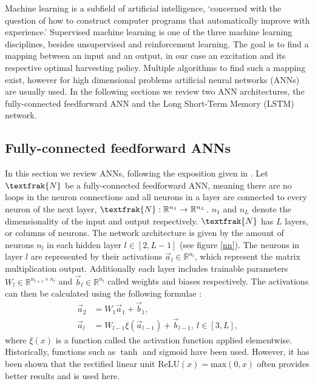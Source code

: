 Machine learning is a subfield of artificial intelligence, `concerned with the question of how to construct computer programs that automatically improve with experience.' \cite{Mitchell97}
Supervised machine learning is one of the three machine learning disciplines, besides unsupervised and reinforcement learning.
The goal is to find a mapping between an input and an output, in our case an excitation and its respective optimal harvesting policy.
Multiple algorithms to find such a mapping exist, however for high dimensional problems artificial neural networks (ANNs) are usually used.
In the following sections we review two ANN architectures, the fully-connected feedforward ANN and the Long Short-Term Memory (LSTM) network.

\subsection{Fully-connected feedforward ANNs}
In this section we review ANNs, following the exposition given in \cite{lu2020dying}.
Let $\textfrak{N}$ be a fully-connected feedforward ANN, meaning there are no loops in the neuron connections and all neurons in a layer are connected to every neuron of the next layer, $\textfrak{N}: \mathbb{R}^{n_1} \to \mathbb{R}^{n_L}$. $n_1$ and $n_L$ denote the dimensionality of the input and output respectively. 
$\textfrak{N}$ has $L$ layers, or columns of neurons.
The network architecture is given by the amount of neurons $n_l$ in each hidden layer $l \in [2, L - 1]$ (see figure \ref{nn}).
The neurons in layer $l$ are represented by their activations $\vec{a}_l \in \mathbb{R}^{n_l}$, which represent the matrix multiplication output. Additionally each layer includes trainable parameters $W_l \in \mathbb{R}^{n_{l+1} \times n_{l}}$ and $\vec{b}_l \in \mathbb{R}^{n_l}$ called weights and biases respectively.
The activations can then be calculated using the following formulae \cite{TN_libero_mab2)53517}:
\begin{align*}
	\vec{a}_2 & = W_1 \vec{a}_1 + \vec{b}_1, \\
	\vec{a}_l & = W_{l-1} \xi(\vec{a}_{l-1}) + \vec{b}_{l-1}, \ l \in [3, L],
\end{align*}
where $\xi(x)$ is a function called the activation function applied elementwise. Historically, functions such as $\tanh$ and sigmoid have been used. However, it has been shown \cite{Maas2013RectifierNI, krizhevsky} that the rectified linear unit $\mathrm{ReLU}(x) = \mathrm{max}(0, x)$ often provides better results and is used here.


